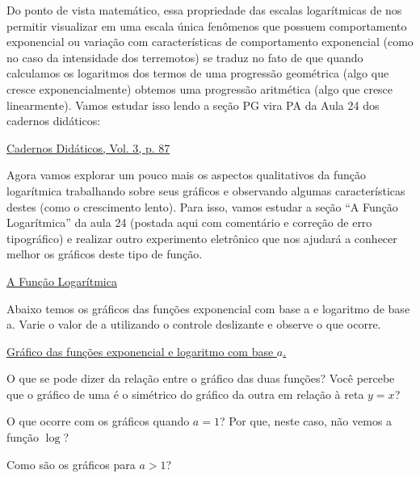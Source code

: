 \documentclass[12pt, a4paper]{article}
\begin{document}
Do ponto de vista matemático, essa propriedade das escalas logarítmicas de nos permitir visualizar em uma escala única fenômenos que possuem comportamento exponencial ou variação com características de comportamento exponencial (como no caso da intensidade dos terremotos) se traduz no fato de que quando calculamos os logaritmos dos termos de uma progressão geométrica (algo que cresce exponencialmente) obtemos uma progressão aritmética (algo que cresce linearmente). Vamos estudar isso lendo a seção PG vira PA da Aula 24 dos cadernos didáticos:

\begin{observacao}[P.G. vira P.A.?]
  \href{https://graduacao.cederj.edu.br/pluginfile.php/25007/mod_resource/content/2/trecho%20aula%2024%20ieaa%20-%20PG%20vira%20PA.pdf}{Cadernos Didáticos, Vol. 3, p. 87}
\end{observacao}

Agora vamos explorar um pouco mais os aspectos qualitativos da função logarítmica trabalhando sobre seus gráficos e observando algumas características destes (como o crescimento lento). Para isso, vamos estudar a seção “A Função Logarítmica” da aula 24 (postada aqui com comentário e correção de erro tipográfico) e realizar outro experimento eletrônico que nos ajudará a conhecer melhor os gráficos deste tipo de função.

\begin{observacao}
  \href{https://graduacao.cederj.edu.br/pluginfile.php/25009/mod_resource/content/1/trecho%20aula%209%20ieaa%20A%20fun%C3%A7%C3%A3o%20Logar%C3%ADtmica.pdf}{A Função Logarítmica}
\end{observacao}

Abaixo temos os gráficos das funções exponencial com base a e logaritmo de base a. Varie o valor de a utilizando o controle deslizante e observe o que ocorre.

\begin{observacao}
  \href{https://www.geogebra.org/m/DThW4YDQ}{Gráfico das funções exponencial e logaritmo com base $a$.}
\end{observacao}

O que se pode dizer da relação entre o gráfico das duas funções? Você percebe que o gráfico de uma é o simétrico do gráfico da outra em relação à reta $y=x$?

O que ocorre com os gráficos quando $a = 1$? Por que, neste caso, não vemos a função $\log$?

Como são os gráficos para $a > 1$?
\end{document}
